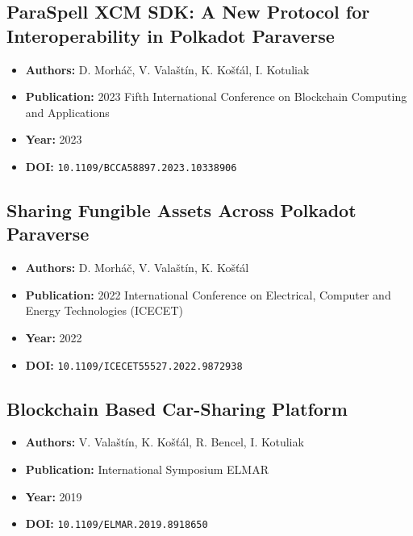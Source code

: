 \subsection{ParaSpell XCM SDK: A New Protocol for Interoperability in Polkadot Paraverse}

\begin{itemize}
    \item \textbf{Authors:} D. Morháč, V. Valaštín, K. Košťál, I. Kotuliak
    \item \textbf{Publication:} 2023 Fifth International Conference on Blockchain Computing and Applications
    \item \textbf{Year:} 2023
    \item \textbf{DOI:} \texttt{10.1109/BCCA58897.2023.10338906}
\end{itemize}

\subsection{Sharing Fungible Assets Across Polkadot Paraverse}

\begin{itemize}
    \item \textbf{Authors:} D. Morháč, V. Valaštín, K. Košťál
    \item \textbf{Publication:} 2022 International Conference on Electrical, Computer and Energy Technologies (ICECET)
    \item \textbf{Year:} 2022
    \item \textbf{DOI:} \texttt{10.1109/ICECET55527.2022.9872938}
\end{itemize}

\subsection{Blockchain Based Car-Sharing Platform}

\begin{itemize}
    \item \textbf{Authors:} V. Valaštín, K. Košťál, R. Bencel, I. Kotuliak
    \item \textbf{Publication:} International Symposium ELMAR
    \item \textbf{Year:} 2019
    \item \textbf{DOI:} \texttt{10.1109/ELMAR.2019.8918650}
\end{itemize}
